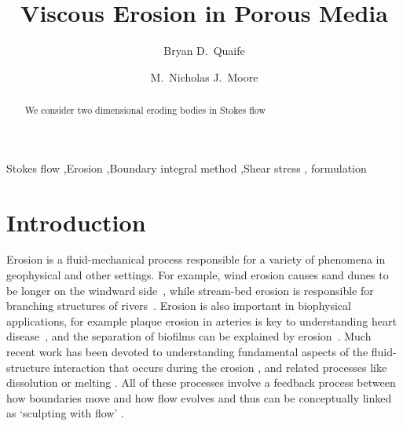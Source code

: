 \documentclass[preprint, 10pt]{elsarticle}
\begin{document}
\title{Viscous Erosion in Porous Media}


\author[Bryan]{Bryan D.~Quaife}
\author[Nick]{M.~Nicholas J.~Moore}
\address[Nick]{Department of Mathematics and Geophysical Fluid Dynamics Institute, Florida State University, Tallahassee, FL, 32306.}
\address[Bryan]{Department of Scientific Computing and Geophysical Fluid Dynamics Institute, Florida State University, Tallahassee, FL, 32306.}

\begin{abstract} 
We consider two dimensional eroding bodies in Stokes flow
\end{abstract}

\begin{keyword}
  Stokes flow \sep Erosion \sep Boundary integral method \sep Shear
  stress \sep {\thL} formulation
\end{keyword}

\maketitle

\section{Introduction\label{s:intro}}

Erosion is a fluid-mechanical process responsible for a variety
of phenomena in geophysical and other settings.  For example,
wind erosion causes sand dunes to be  longer on the windward
side~\cite{han1969}, while stream-bed erosion is responsible for branching structures
of rivers~\cite{coh-dev-sey-yi-szy-rot2015}.  Erosion is
also important in biophysical applications, for example plaque erosion in arteries
is key to understanding heart disease~\cite{sha2002,
gro-gij-van-fer-hat-van-yua-wen2007}, and the separation of biofilms can
be explained by erosion~\cite{pic-van-hei2000}. 
Much recent work has been devoted to understanding fundamental aspects of the fluid-structure interaction that occurs during the erosion \cite{ris-moo-chi-she-zha2012, moo-ris-chi-zha-she2013, mit-spa2016, hewett2017evolution, moore2017riemann, lachaussee2018competitive, lopez2018cfd}, and related processes like dissolution or melting \cite{Huang2015, kondratiuk2015steadily, rycroft2016asymmetric, cohen2016erosion, yuan2017dynamics, claudin2017dissolution, hewett2017pear}. All of these processes involve a feedback process between how boundaries move and how flow evolves and thus can be conceptually linked  as `sculpting with flow' \cite{ristroph2018sculpting}.
\end{document}
